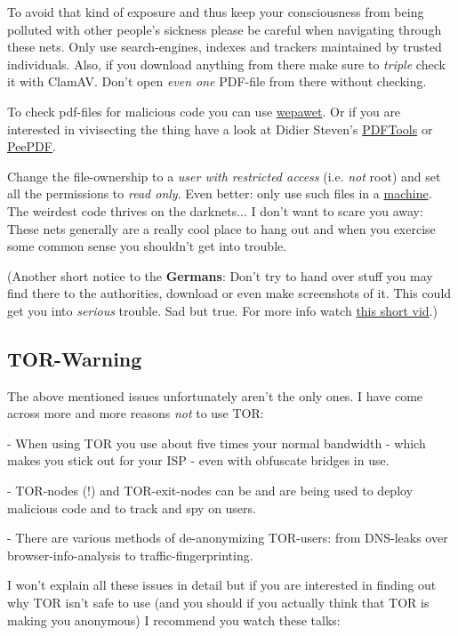 \documentclass{article}
\begin{document}
 


 To avoid that kind of exposure and thus keep your consciousness from being polluted with other people's sickness please be careful when navigating through these nets. Only use search-engines, indexes and trackers maintained by trusted individuals. Also, if you download anything from there make sure to \emph{triple} check it with ClamAV. Don't open \emph{even one} PDF-file from there without checking. 


 To check pdf-files for malicious code you can use \href{https://wepawet.cs.ucsb.edu/}{wepawet}. Or if you are interested in vivisecting the thing have a look at Didier Steven's \href{http://blog.didierstevens.com/programs/pdf-tools/}{PDFTools} or \href{https://code.google.com/p/peepdf/}{PeePDF}.


 Change the file-ownership to a \emph{user with restricted access} (i.e. \emph{not} root) and set all the permissions to \emph{read only}. Even better: only use such files in a \href{https://www.virtualbox.org/}{ machine}. The weirdest code thrives on the darknets... I don't want to scare you away: These nets generally are a really cool place to hang out and when you exercise some common sense you shouldn't get into trouble. 


 (Another short notice to the \textbf{Germans}: Don't try to hand over stuff you may find there to the authorities, download or even make screenshots of it. This could get you into \emph{serious} trouble. Sad but true. For more info watch \href{http://youtu.be/6loPIa7Ri4Q}{this short vid}.)
\subsection{TOR-Warning}


 The above mentioned issues unfortunately aren't the only ones. I have come across more and more reasons \emph{not} to use TOR:


 - When using TOR you use about five times your normal bandwidth - which makes you stick out for your ISP - even with obfuscate bridges in use. 


 - TOR-nodes (!) and TOR-exit-nodes can be and are being used to deploy malicious code and to track and spy on users. 


 - There are various methods of de-anonymizing TOR-users: from DNS-leaks over browser-info-analysis to traffic-fingerprinting. 


 I won't explain all these issues in detail but if you are interested in finding out why TOR isn't safe to use (and you should if you actually think that TOR is making you anonymous) I recommend you watch these talks:
\end{document}
